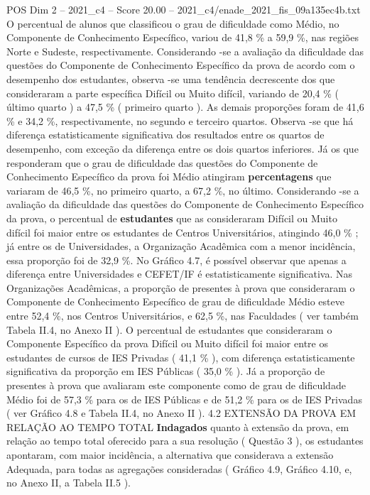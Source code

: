 \begin{textsample}{POS Dim 2 – 2021\_c4 – Score 20.00 – 2021\_c4/enade\_2021\_fis\_09a135ec4b.txt}
O percentual de alunos que classificou o grau de dificuldade como Médio, no Componente de Conhecimento Específico, variou de 41,8 \% a 59,9 \%, nas regiões Norte e Sudeste, respectivamente.
Considerando -se a avaliação da dificuldade das questões do Componente de Conhecimento Específico da prova de acordo com o desempenho dos estudantes, observa -se uma tendência decrescente dos que consideraram a parte específica Difícil ou Muito difícil, variando de 20,4 \% ( último quarto ) a 47,5 \% ( primeiro quarto ).
As demais proporções foram de 41,6 \% e 34,2 \%, respectivamente, no segundo e terceiro quartos.
Observa -se que há diferença estatisticamente significativa dos resultados entre os quartos de desempenho, com exceção da diferença entre os dois quartos inferiores.
Já os que responderam que o grau de dificuldade das questões do Componente de Conhecimento Específico da prova foi Médio atingiram \textbf{percentagens} que variaram de 46,5 \%, no primeiro quarto, a 67,2 \%, no último.
Considerando -se a avaliação da dificuldade das questões do Componente de Conhecimento Específico da prova, o percentual de \textbf{estudantes} que as consideraram Difícil ou Muito difícil foi maior entre os estudantes de Centros Universitários, atingindo 46,0 \% ; já entre os de Universidades, a Organização Acadêmica com a menor incidência, essa proporção foi de 32,9 \%.
No Gráfico 4.7, é possível observar que apenas a diferença entre Universidades e CEFET/IF é estatisticamente significativa.
Nas Organizações Acadêmicas, a proporção de presentes à prova que consideraram o Componente de Conhecimento Específico de grau de dificuldade Médio esteve entre 52,4 \%, nos Centros Universitários, e 62,5 \%, nas Faculdades ( ver também Tabela II.4, no Anexo II ).
O percentual de estudantes que consideraram o Componente Específico da prova Difícil ou Muito difícil foi maior entre os estudantes de cursos de IES Privadas ( 41,1 \% ), com diferença estatisticamente significativa da proporção em IES Públicas ( 35,0 \% ).
Já a proporção de presentes à prova que avaliaram este componente como de grau de dificuldade Médio foi de 57,3 \% para os de IES Públicas e de 51,2 \% para os de IES Privadas ( ver Gráfico 4.8 e Tabela II.4, no Anexo II ). 4.2 EXTENSÃO DA PROVA EM RELAÇÃO AO TEMPO TOTAL \textbf{Indagados} quanto à extensão da prova, em relação ao tempo total oferecido para a sua resolução ( Questão 3 ), os estudantes apontaram, com maior incidência, a alternativa que considerava a extensão Adequada, para todas as agregações consideradas ( Gráfico 4.9, Gráfico 4.10, e, no Anexo II, a Tabela II.5 ).

\end{textsample}
